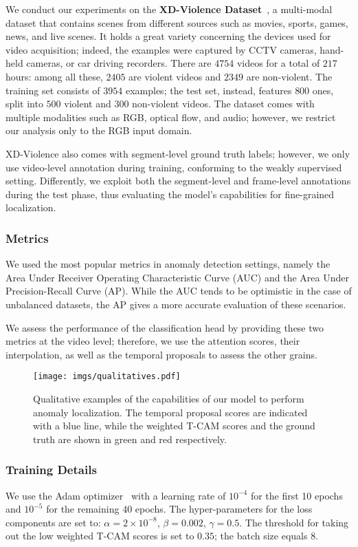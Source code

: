 \documentclass[runningheads]{llncs}
\begin{document}
We conduct our experiments on the \textbf{XD-Violence Dataset}~\cite{wu2020not}, a multi-modal dataset that contains scenes from different sources such as movies, sports, games, news, and live scenes. It holds a great variety concerning the devices used for video acquisition; indeed, the examples were captured by CCTV cameras, hand-held cameras, or car driving recorders. There are $4754$ videos for a total of $217$ hours: among all these, $2405$ are violent videos and $2349$ are non-violent. The training set consists of $3954$ examples; the test set, instead, features $800$ ones, split into $500$ violent and $300$ non-violent videos. The dataset comes with multiple modalities such as RGB, optical flow, and audio; however, we restrict our analysis only to the RGB input domain.

XD-Violence also comes with segment-level ground truth labels; however, we only use video-level annotation during training, conforming to the weakly supervised setting. Differently, we exploit both the segment-level and frame-level annotations during the test phase, thus evaluating the model's capabilities for fine-grained localization.
\subsubsection{Metrics}
We used the most popular metrics in anomaly detection settings, namely the Area Under Receiver Operating Characteristic Curve (AUC) and the Area Under Precision-Recall Curve (AP). While the AUC tends to be optimistic in the case of unbalanced datasets, the AP gives a more accurate evaluation of these scenarios.

We assess the performance of the classification head by providing these two metrics at the video level; therefore, we use the attention scores, their interpolation, as well as the temporal proposals to assess the other grains.
\begin{figure}[t]
    \centering
    \texttt{[image: imgs/qualitatives.pdf]}
    \caption{Qualitative examples of the capabilities of our model to perform anomaly localization. The temporal proposal scores are indicated with a blue line, while the weighted T-CAM scores and the ground truth are shown in green and red respectively.}
    \label{fig:align}
\end{figure}
\subsubsection{Training Details}
We use the Adam optimizer~\cite{kingma2014adam} with a learning rate of $10^{-4}$ for the first 10 epochs and $10^{-5}$ for the remaining 40 epochs. The hyper-parameters for the loss components are set to: $\alpha=2\times 10^{-8}$, $\beta=0.002$, $\gamma=0.5$. The threshold for taking out the low weighted T-CAM scores is set to $0.35$; the batch size equals 8.
\end{document}
